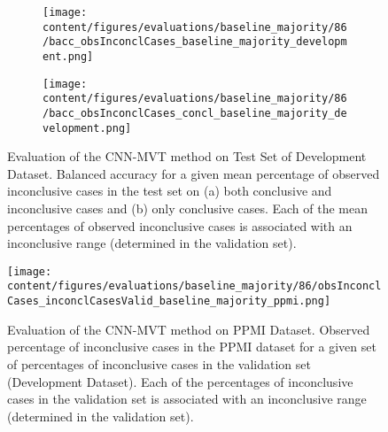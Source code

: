 \begin{figure}[t]
  \begin{subfigure}{0.9\textwidth}
    \centering
    \texttt{[image: content/figures/evaluations/baseline\_majority/86/bacc\_obsInconclCases\_baseline\_majority\_development.png]}
    \subcaption{}
    \label{fig:bacc_obsInconclCases_baseline_majority_development}
  \end{subfigure}
  \hfill
  \begin{subfigure}{0.9\textwidth}
    \centering
    \texttt{[image: content/figures/evaluations/baseline\_majority/86/bacc\_obsInconclCases\_concl\_baseline\_majority\_development.png]}
    \subcaption{}
    \label{fig:bacc_obsInconclCases_concl_baseline_majority_development}
  \end{subfigure}

  \caption{Evaluation of the CNN-MVT method on Test Set of Development Dataset.
  Balanced accuracy for a given mean percentage of observed inconclusive cases in the test set on 
  (a) both conclusive and inconclusive cases and (b) only conclusive cases. 
  Each of the mean percentages of observed inconclusive cases is associated with an inconclusive range (determined in the validation set). }
  \label{fig:bacc_obsInconclCases_baseline_majority_development_full}
\end{figure}




\begin{figure}[h]
\centering
\texttt{[image: content/figures/evaluations/baseline\_majority/86/obsInconclCases\_inconclCasesValid\_baseline\_majority\_ppmi.png]}
\caption{Evaluation of the CNN-MVT method on PPMI Dataset.
Observed percentage of inconclusive cases in the PPMI dataset 
for a given set of percentages of inconclusive cases in the validation set (Development Dataset).
Each of the percentages of inconclusive cases in the validation set is associated 
with an inconclusive range (determined in the validation set).} 
\label{fig:obsInconclCases_inconclCasesValid_baseline_majority_ppmi}
\end{figure} 


